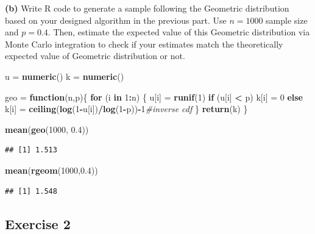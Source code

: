 \documentclass[
]{article}
\newenvironment{Shaded}{\begin{snugshade}}{\end{snugshade}}
\newcommand{\CommentTok}[1]{\textcolor[rgb]{0.56,0.35,0.01}{\textit{#1}}}
\newcommand{\ControlFlowTok}[1]{\textcolor[rgb]{0.13,0.29,0.53}{\textbf{#1}}}
\newcommand{\DecValTok}[1]{\textcolor[rgb]{0.00,0.00,0.81}{#1}}
\newcommand{\FloatTok}[1]{\textcolor[rgb]{0.00,0.00,0.81}{#1}}
\newcommand{\KeywordTok}[1]{\textcolor[rgb]{0.13,0.29,0.53}{\textbf{#1}}}
\newcommand{\NormalTok}[1]{#1}
\newcommand{\OperatorTok}[1]{\textcolor[rgb]{0.81,0.36,0.00}{\textbf{#1}}}
\newcommand{\StringTok}[1]{\textcolor[rgb]{0.31,0.60,0.02}{#1}}
\begin{document}
\textbf{(b)} Write R code to generate a sample following the Geometric
distribution based on your designed algorithm in the previous part. Use
\(n=1000\) sample size and \(p=0.4\). Then, estimate the expected value
of this Geometric distribution via Monte Carlo integration to check if
your estimates match the theoretically expected value of Geometric
distribution or not.

\begin{Shaded}
\begin{Highlighting}[]
\NormalTok{u =}\StringTok{ }\KeywordTok{numeric}\NormalTok{()}
\NormalTok{k =}\StringTok{ }\KeywordTok{numeric}\NormalTok{()}

\NormalTok{geo =}\StringTok{ }\ControlFlowTok{function}\NormalTok{(n,p)\{}
\ControlFlowTok{for}\NormalTok{ (i }\ControlFlowTok{in} \DecValTok{1}\OperatorTok{:}\NormalTok{n) \{}
\NormalTok{  u[i] =}\StringTok{ }\KeywordTok{runif}\NormalTok{(}\DecValTok{1}\NormalTok{)}
  \ControlFlowTok{if}\NormalTok{ (u[i] }\OperatorTok{<}\StringTok{ }\NormalTok{p)}
\NormalTok{    k[i] =}\StringTok{ }\DecValTok{0}
  \ControlFlowTok{else}
\NormalTok{    k[i] =}\StringTok{ }\KeywordTok{ceiling}\NormalTok{(}\KeywordTok{log}\NormalTok{(}\DecValTok{1}\OperatorTok{-}\NormalTok{u[i])}\OperatorTok{/}\KeywordTok{log}\NormalTok{(}\DecValTok{1}\OperatorTok{-}\NormalTok{p))}\OperatorTok{-}\DecValTok{1}\CommentTok{#inverse cdf}
\NormalTok{\}}
  \KeywordTok{return}\NormalTok{(k)}
\NormalTok{\}}

\KeywordTok{mean}\NormalTok{(}\KeywordTok{geo}\NormalTok{(}\DecValTok{1000}\NormalTok{, }\FloatTok{0.4}\NormalTok{))}
\end{Highlighting}
\end{Shaded}

\begin{verbatim}
## [1] 1.513
\end{verbatim}

\begin{Shaded}
\begin{Highlighting}[]
\KeywordTok{mean}\NormalTok{(}\KeywordTok{rgeom}\NormalTok{(}\DecValTok{1000}\NormalTok{,}\FloatTok{0.4}\NormalTok{))}
\end{Highlighting}
\end{Shaded}

\begin{verbatim}
## [1] 1.548
\end{verbatim}

\hypertarget{exercise-2}{%
\subsection{Exercise 2}\label{exercise-2}}
\end{document}
